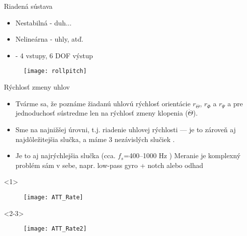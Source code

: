 \begin{frame}{Riadená sústava}
\begin{itemize}
  \item<1-> Nestabilná  - duh...
  \item<2-> Nelineárna  - uhly, atď.
  \item<3->  - 4 vstupy, 6 DOF výstup \citep{Douglas2018}
\end{itemize}
\begin{figure}
\centering
  \texttt{[image: rollpitch]}\\
\end{figure}
\end{frame}

\begin{frame}[t]{Rýchlosť zmeny uhlov}
\begin{itemize}
  \item<1-> Tvárme sa, že poznáme žiadanú uhlovú rýchlosť orientácie $r_{\dot{\Theta}}$, $r_{\dot{\Phi}}$ a $r_{\dot{\Psi}}$ a pre jednoduchosť sústredme len na rýchlosť zmeny klopenia ($\dot{\Theta}$).
  \item<2-> Sme na najnižšej úrovni, t.j. riadenie uhlovej rýchlosti  --- je to zároveň aj najdôležitejšia slučka, a máme 3 nezávislých slučiek \citep{AP:PID,PX4:PIDTuning}.
  \item<3->  Je to aj najrýchlejšia slučka (cca. $f_s$=400--1000 Hz \citep{AP:PID,PX4:PIDTuning}) Meranie je komplexný problém sám v sebe, napr. low-pass gyro + notch \citep{Bresciani2020} alebo odhad
  \end{itemize}

  \begin{onlyenv}<1>
  \begin{figure}
\centering
  \texttt{[image: ATT\_Rate]}\\
\end{figure}
\end{onlyenv}

  \begin{onlyenv}<2-3>
  \begin{figure}
\centering
  \texttt{[image: ATT\_Rate2]}\\
\end{figure}
\end{onlyenv}
  \end{frame}



